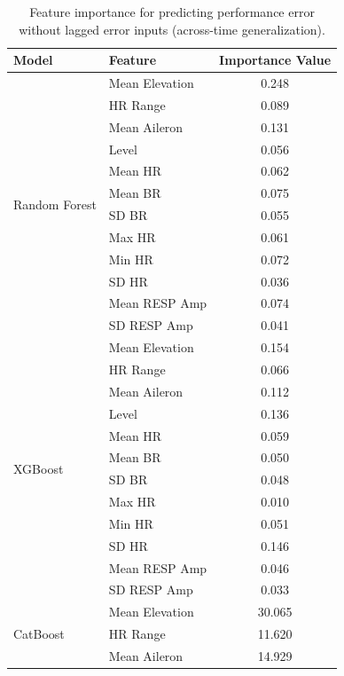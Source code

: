 \documentclass[11pt, a4paper]{article}
\begin{document}
\begin{table}[htbp]
	\centering
	\caption{Feature importance for predicting performance error without lagged error inputs (across-time generalization).}
	\label{tab:feat_imp_time_no_lag}
	\small
	\begin{tabular}{llc}
		\toprule
		Model & Feature  & Importance Value\\
		\midrule
		\multirow{12}{*}{Random Forest} &Mean Elevation & 0.248\\
										&HR Range       & 0.089\\
										&Mean Aileron         & 0.131\\
										&Level     & 0.056 \\
										&Mean HR             & 0.062\\
										&Mean BR             & 0.075\\
										&SD BR              & 0.055\\
										&Max HR              & 0.061\\
										&Min HR              & 0.072\\
										&SD HR             & 0.036\\
										&Mean RESP Amp       & 0.074\\
										&SD RESP Amp        & 0.041\\								
		\midrule
		\multirow{12}{*}{XGBoost}		&Mean Elevation & 0.154\\
										&HR Range       & 0.066\\
										&Mean Aileron         & 0.112\\
										&Level      & 0.136 \\
										&Mean HR             & 0.059\\
										&Mean BR             & 0.050\\
										&SD BR              & 0.048\\
										&Max HR             & 0.010 \\
										&Min HR              & 0.051 \\
										&SD HR             & 0.146\\
										&Mean RESP Amp       & 0.046\\
										&SD RESP Amp		& 0.033 \\
		\midrule											 
		\multirow{12}{*}{CatBoost}		&Mean Elevation & 30.065 \\
										&HR Range       & 11.620 \\
										&Mean Aileron         & 14.929 \\

\end{tabular}
\end{table}
\end{document}
